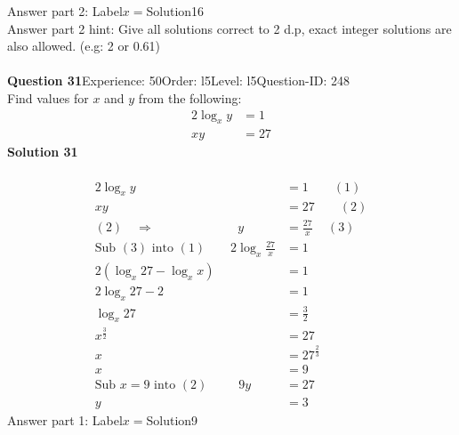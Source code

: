 \documentclass{article}
\begin{document}
Answer part 2: \hspace{10pt}Label\hspace{10pt}$x=$\hspace{10pt}Solution\hspace{10pt}16\\
Answer part 2 hint: \hspace{15pt}Give all solutions correct to 2 d.p, exact integer solutions are also allowed. (e.g: 2 or 0.61)\\
\\[4pt]
\noindent\textbf{Question 31}\hspace{20pt}Experience: 50\hspace{20pt}Order: l5\hspace{20pt}Level: l5\hspace{20pt}Question-ID: 248\\[2pt]
Find values for $x$ and $y$ from the following:
\begin{align*}
2\log_{x}y&=1\\[2pt]
xy&=27
\end{align*}
\noindent\textbf{Solution 31}\\[2pt]
\\[-35pt]\begin{align*}
2\log_{x}y&=1\qquad (1)\\[2pt]
xy&=27\qquad (2)\\[2pt]
(2) \quad\Rightarrow\hspace{80pt} y&=\displaystyle\frac{27}{x}\hspace{14pt} (3)\\[2pt]
\text{Sub}\,\,(3)\,\,\text{into}\,\,(1)\qquad 2\log_{x}\displaystyle\frac{27}{x}&=1\\[2pt]
2(\log_{x}27-\log_{x}x)&=1\\[2pt]
2\log_{x}27-2&=1\\[2pt]
\log_{x}27&=\displaystyle\frac{3}{2}\\[2pt]
x^{\frac{3}{2}}&=27\\[2pt]
x&=27^{\frac{2}{3}}\\[2pt]
x&=9\\[12pt]
\text{Sub}\,\,x=9\,\,\text{into}\,\,(2)\hspace{30pt}9y&=27\\[2pt]
y&=3
\end{align*}
Answer part 1: \hspace{10pt}Label\hspace{10pt}$x=$\hspace{10pt}Solution\hspace{10pt}9\\
\end{document}
